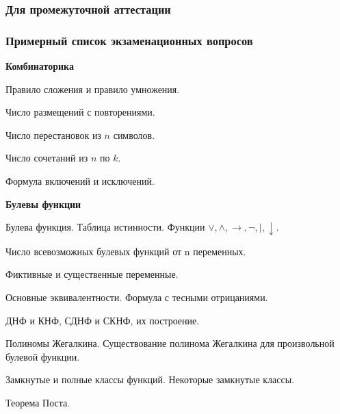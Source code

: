 \documentclass{rpd}
\begin{document}
        


    \subsubsection{Для промежуточной аттестации}
        \subsubsection*{Примерный список экзаменационных вопросов}
        \textbf{Комбинаторика}
            \begin{examquestions}
            \item
            Правило сложения и правило умножения.
            \item
            Число размещений с повторениями.
            \item
            Число перестановок из $n$ символов.
            \item
            Число сочетаний из $n$ по $k$.
            \item
            Формула включений и исключений.
            \end{examquestions}

            \smallskip
            \textbf{Булевы функции}
            \begin{examquestions}
            \item
            Булева функция. Таблица истинности. Функции $\vee, \wedge, \to, \neg, \vert, \downarrow$. 
            \item
            Число всевозможных булевых функций от n переменных.
            \item
            Фиктивные и существенные переменные.
            \item
            Основные эквивалентности. Формула с тесными отрицаниями. 
            \item
            ДНФ и КНФ, СДНФ и СКНФ, их построение. 
            \item
            Полиномы Жегалкина. Существование полинома Жегалкина для произвольной булевой функции.
            \item
            Замкнутые и полные классы функций. Некоторые замкнутые классы.
            \item
            Теорема Поста.
            \end{examquestions}
\end{document}
